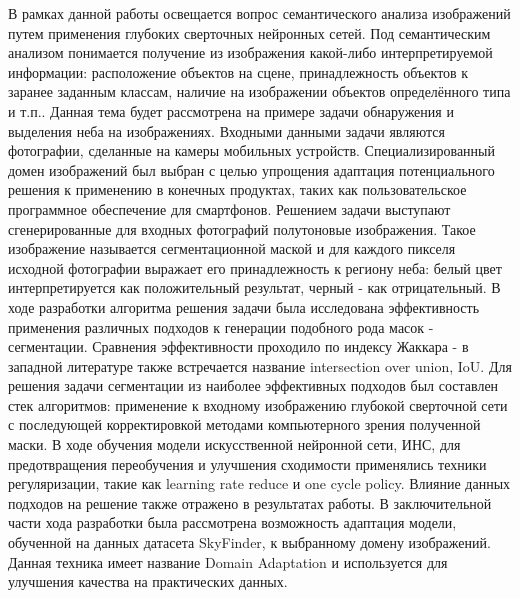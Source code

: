 \usepackage{amsmath}







\Intro

В рамках данной работы освещается вопрос семантического анализа изображений путем применения глубоких сверточных нейронных сетей.
Под семантическим анализом понимается получение из изображения какой-либо интерпретируемой информации: расположение объектов на сцене,
принадлежность объектов к заранее заданным классам, наличие на изображении объектов определённого типа и т.п..
Данная тема будет рассмотрена на примере задачи обнаружения и выделения неба на изображениях.
Входными данными задачи являются фотографии, сделанные на камеры мобильных устройств.
Специализированный домен изображений был выбран с целью упрощения адаптация потенциального решения к применению в конечных продуктах,
таких как пользовательское программное обеспечение для смартфонов.
Решением задачи выступают сгенерированные для входных фотографий полутоновые изображения.
Такое изображение называется сегментационной маской и для каждого пикселя исходной фотографии выражает его принадлежность
к региону неба: белый цвет интерпретируется как положительный результат, черный - как отрицательный.
В ходе разработки алгоритма решения задачи была исследована эффективность применения различных подходов к генерации подобного рода масок - сегментации.
Сравнения эффективности проходило по индексу Жаккара - в западной литературе также встречается название intersection over union, IoU\@.
Для решения задачи сегментации из наиболее эффективных подходов был составлен стек алгоритмов: применение к входному изображению глубокой сверточной сети
с последующей корректировкой методами компьютерного зрения полученной маски.
В ходе обучения модели искусственной нейронной сети, ИНС, для предотвращения переобучения и улучшения сходимости
применялись техники регуляризации, такие как learning rate reduce и one cycle policy.
Влияние данных подходов на решение также отражено в результатах работы.
В заключительной части хода разработки была рассмотрена возможность адаптация модели, обученной на данных датасета SkyFinder,
к выбранному домену изображений.
Данная техника имеет название Domain Adaptation и используется для улучшения качества на практических данных.

